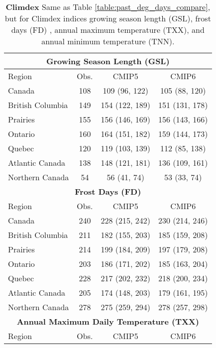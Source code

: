 \documentclass[]{scrartcl}
\begin{document}
\begin{appendices}
\begin{table}[t]
	\caption{\textbf{Climdex} Same as Table \ref{table:past_deg_days_compare}, but for Climdex indices growing season length (GSL), frost days (FD) , annual maximum temperature (TXX), and annual minimum temperature (TNN).}\label{table:past_climdex_compare}
	\begin{center}
		\begin{tabular}{|l|ccc|} 
			\hline
			\multicolumn{4}{|c|}{\textbf{Growing Season Length (GSL)}} \\
			\hline
			Region & Obs. & CMIP5 & CMIP6   \\
			\hline
			Canada & 108 & 109 (96, 122) & 105 (88, 120) \\ 
			British Columbia & 149 & 154 (122, 189) & 151 (131, 178) \\ 
			Prairies & 155 & 156 (146, 169) & 156 (143, 166) \\ 
			Ontario & 160 & 164 (151, 182) & 159 (144, 173) \\ 
			Quebec & 120 & 119 (103, 139) & 112 (85, 138) \\ 
			Atlantic Canada & 138 & 148 (121, 181) & 136 (109, 161) \\ 
			Northern Canada & 54 & 56 (41, 74) & 53 (33, 74) \\ 
			\hline	
			\multicolumn{4}{|c|}{\textbf{Frost Days (FD)}} \\
			\hline
			Region & Obs. & CMIP5 & CMIP6   \\
			\hline
			Canada & 240 & 228 (215, 242) & 230 (214, 246) \\ 
			British Columbia & 211 & 182 (155, 203) & 185 (159, 208) \\ 
			Prairies & 214 & 199 (184, 209) & 197 (179, 208) \\ 
			Ontario & 203 & 186 (171, 202) & 185 (163, 204) \\ 
			Quebec & 228 & 217 (202, 232) & 218 (200, 234) \\ 
			Atlantic Canada & 205 & 174 (148, 203) & 179 (161, 195) \\ 
			Northern Canada & 278 & 275 (259, 294) & 278 (257, 298) \\ 
			\hline	
			\multicolumn{4}{|c|}{\textbf{Annual Maximum Daily Temperature (TXX)}} \\
			\hline
			Region & Obs. & CMIP5 & CMIP6   \\

\end{tabular}
\end{center}
\end{table}
\end{appendices}
\end{document}
